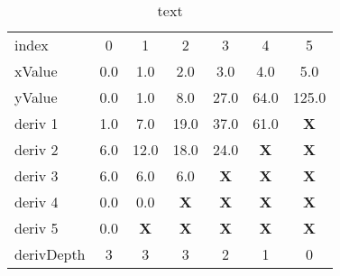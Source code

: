 \documentclass[main.tex]{subfiles}
\begin{document}
  
  \begin{table}[h]
    \centering
    \caption{text}
    \begin{tabularx}{0.65\linewidth}{ X | c c c c c c }
      index & 0 & 1 & 2 & 3 & 4 & 5 \\
      xValue & 0.0 & 1.0 & 2.0 & 3.0 & 4.0 & 5.0 \\
      \hline \hline
      yValue & 0.0 & 1.0 & 8.0 & 27.0 & 64.0 & 125.0 \\
      \hline
      deriv 1 & 1.0 & 7.0 & 19.0 & 37.0 & 61.0 & \textbf{X} \\
      deriv 2 & 6.0 & 12.0 & 18.0 & 24.0 & \textbf{X} & \textbf{X} \\
      deriv 3 & 6.0 & 6.0 & 6.0 & \textbf{X} & \textbf{X} & \textbf{X} \\
      deriv 4 & 0.0 & 0.0 & \textbf{X} & \textbf{X} & \textbf{X} & \textbf{X} \\
      deriv 5 & 0.0 & \textbf{X} & \textbf{X} & \textbf{X} & \textbf{X} & \textbf{X} \\
      \hline
      derivDepth & 3  & 3 & 3 & 2 & 1 & 0 \\
    \end{tabularx}
  \label{tbl:mtrx:endError}
  \end{table}
  
\end{document}
